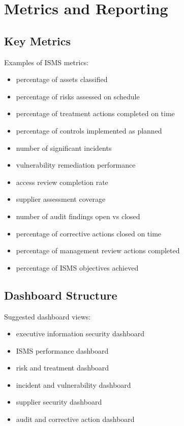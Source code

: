 \documentclass[
  letterpaper,
  DIV=11,
  numbers=noendperiod]{scrartcl}
\providecommand{\tightlist}{%
  \setlength{\itemsep}{0pt}\setlength{\parskip}{0pt}}
\begin{document}
\section{Metrics and Reporting}\label{metrics-and-reporting}

\subsection{Key Metrics}\label{key-metrics}

Examples of ISMS metrics:

\begin{itemize}
\tightlist
\item
  percentage of assets classified
\item
  percentage of risks assessed on schedule
\item
  percentage of treatment actions completed on time
\item
  percentage of controls implemented as planned
\item
  number of significant incidents
\item
  vulnerability remediation performance
\item
  access review completion rate
\item
  supplier assessment coverage
\item
  number of audit findings open vs closed
\item
  percentage of corrective actions closed on time
\item
  percentage of management review actions completed
\item
  percentage of ISMS objectives achieved
\end{itemize}

\subsection{Dashboard Structure}\label{dashboard-structure}

Suggested dashboard views:

\begin{itemize}
\tightlist
\item
  executive information security dashboard
\item
  ISMS performance dashboard
\item
  risk and treatment dashboard
\item
  incident and vulnerability dashboard
\item
  supplier security dashboard
\item
  audit and corrective action dashboard
\end{itemize}
\end{document}

